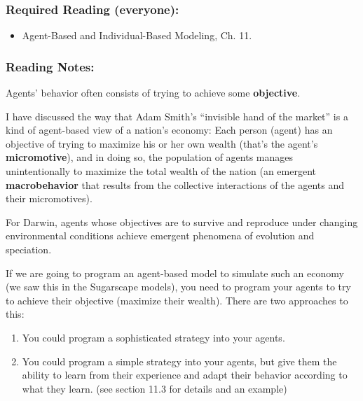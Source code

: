 \documentclass[
]{article}
\providecommand{\tightlist}{%
  \setlength{\itemsep}{0pt}\setlength{\parskip}{0pt}}
\begin{document}
\hypertarget{required-reading-everyone-10}{%
\subsubsection{Required Reading
(everyone):}\label{required-reading-everyone-10}}

\begin{itemize}
\tightlist
\item
  Agent-Based and Individual-Based Modeling, Ch. 11.
\end{itemize}

\hypertarget{reading-notes-10}{%
\subsubsection{Reading Notes:}\label{reading-notes-10}}

Agents' behavior often consists of trying to achieve some
\textbf{objective}.

I have discussed the way that Adam Smith's ``invisible hand of the
market'' is a kind of agent-based view of a nation's economy: Each
person (agent) has an objective of trying to maximize his or her own
wealth (that's the agent's \textbf{micromotive}), and in doing so, the
population of agents manages unintentionally to maximize the total
wealth of the nation (an emergent \textbf{macrobehavior} that results
from the collective interactions of the agents and their micromotives).

For Darwin, agents whose objectives are to survive and reproduce under
changing environmental conditions achieve emergent phenomena of
evolution and speciation.

If we are going to program an agent-based model to simulate such an
economy (we saw this in the Sugarscape models), you need to program your
agents to try to achieve their objective (maximize their wealth). There
are two approaches to this:

\begin{enumerate}
\def\labelenumi{\arabic{enumi}.}
\tightlist
\item
  You could program a sophisticated strategy into your agents.
\item
  You could program a simple strategy into your agents, but give them
  the ability to learn from their experience and adapt their behavior
  according to what they learn. (see section 11.3 for details and an
  example)
\end{enumerate}
\end{document}
